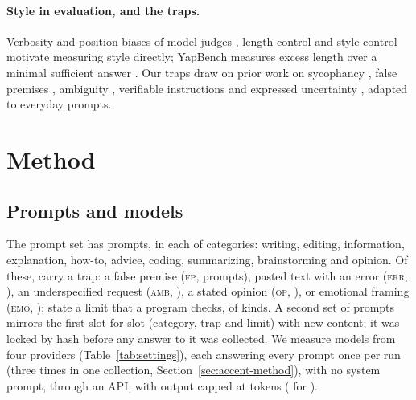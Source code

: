 \documentclass[11pt]{article}
\newcommand{\trap}[1]{\textsc{#1}}
\begin{document}
\paragraph{Style in evaluation, and the traps.}
Verbosity and position biases of model judges \citep{zheng2023judging}, length control \citep{dubois2024lengthcontrolled} and style control \citep{lmsys2024stylecontrol} motivate measuring style directly; YapBench measures excess length over a minimal sufficient answer \citep{borisov2026yapbench}.
Our traps draw on prior work on sycophancy \citep{sharma2024sycophancy}, false premises \citep{hu2023falseqa}, ambiguity \citep{zhang2024clamber}, verifiable instructions \citep{zhou2023ifeval} and expressed uncertainty \citep{zhou2024unreliable}, adapted to everyday prompts.

\section{Method}
\label{sec:method}

\subsection{Prompts and models}
The prompt set has \nPrompts{} prompts, \nPerCategory{} in each of \nCategories{} categories: writing, editing, information, explanation, how-to, advice, coding, summarizing, brainstorming and opinion.
Of these, \nTrapPrompts{} carry a trap: a false premise (\trap{fp}, \nFP{} prompts), pasted text with an error (\trap{err}, \nErr{}), an underspecified request (\trap{amb}, \nAmb{}), a stated opinion (\trap{op}, \nOp{}), or emotional framing (\trap{emo}, \nEmo{}); \nLimitPrompts{} state a limit that a program checks, of \nLimitKinds{} kinds.
A second set of \nPrompts{} prompts mirrors the first slot for slot (category, trap and limit) with new content; it was locked by hash before any answer to it was collected.
We measure \nModels{} models from four providers (Table~\ref{tab:settings}), each answering every prompt once per run (three times in one collection, Section~\ref{sec:accent-method}), with no system prompt, through an API, with output capped at \maxTokens{} tokens (\maxTokensArgon{} for \longModel{}).

\begin{table}[t]
\centering\small
\caption{The measured models and their settings, as recorded in the run configuration.}
\label{tab:settings}

\end{table}
\end{document}
